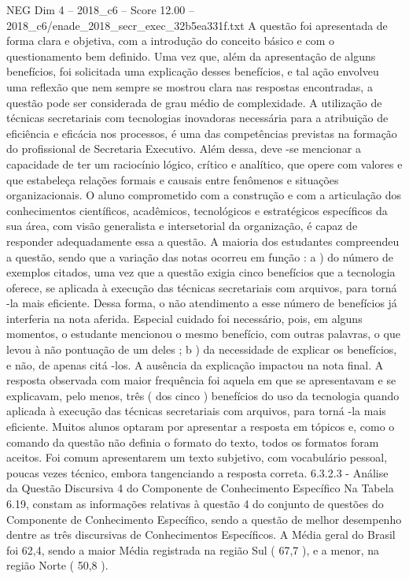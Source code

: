 \begin{textsample}{NEG Dim 4 – 2018\_c6 – Score 12.00 – 2018\_c6/enade\_2018\_secr\_exec\_32b5ea331f.txt}
A questão foi apresentada de forma clara e objetiva, com a introdução do conceito básico e com o questionamento bem definido.
Uma vez que, além da apresentação de alguns benefícios, foi solicitada uma explicação desses benefícios, e tal ação envolveu uma reflexão que nem sempre se mostrou clara nas respostas encontradas, a questão pode ser considerada de grau médio de complexidade.
A utilização de técnicas secretariais com tecnologias inovadoras necessária para a atribuição de eficiência e eficácia nos processos, é uma das competências previstas na formação do profissional de Secretaria Executivo.
Além dessa, deve -se mencionar a capacidade de ter um raciocínio lógico, crítico e analítico, que opere com valores e que estabeleça relações formais e causais entre fenômenos e situações organizacionais.
O aluno comprometido com a construção e com a articulação dos conhecimentos científicos, acadêmicos, tecnológicos e estratégicos específicos da sua área, com visão generalista e intersetorial da organização, é capaz de responder adequadamente essa a questão.
A maioria dos estudantes compreendeu a questão, sendo que a variação das notas ocorreu em função : a ) do número de exemplos citados, uma vez que a questão exigia cinco benefícios que a tecnologia oferece, se aplicada à execução das técnicas secretariais com arquivos, para torná -la mais eficiente.
Dessa forma, o não atendimento a esse número de benefícios já interferia na nota aferida.
Especial cuidado foi necessário, pois, em alguns momentos, o estudante mencionou o mesmo benefício, com outras palavras, o que levou à não pontuação de um deles ; b ) da necessidade de explicar os benefícios, e não, de apenas citá -los.
A ausência da explicação impactou na nota final.
A resposta observada com maior frequência foi aquela em que se apresentavam e se explicavam, pelo menos, três ( dos cinco ) benefícios do uso da tecnologia quando aplicada à execução das técnicas secretariais com arquivos, para torná -la mais eficiente.
Muitos alunos optaram por apresentar a resposta em tópicos e, como o comando da questão não definia o formato do texto, todos os formatos foram aceitos.
Foi comum apresentarem um texto subjetivo, com vocabulário pessoal, poucas vezes técnico, embora tangenciando a resposta correta. 6.3.2.3 - Análise da Questão Discursiva 4 do Componente de Conhecimento Específico Na Tabela 6.19, constam as informações relativas à questão 4 do conjunto de questões do Componente de Conhecimento Específico, sendo a questão de melhor desempenho dentre as três discursivas de Conhecimentos Específicos.
A Média geral do Brasil foi 62,4, sendo a maior Média registrada na região Sul ( 67,7 ), e a menor, na região Norte ( 50,8 ).

\end{textsample}

